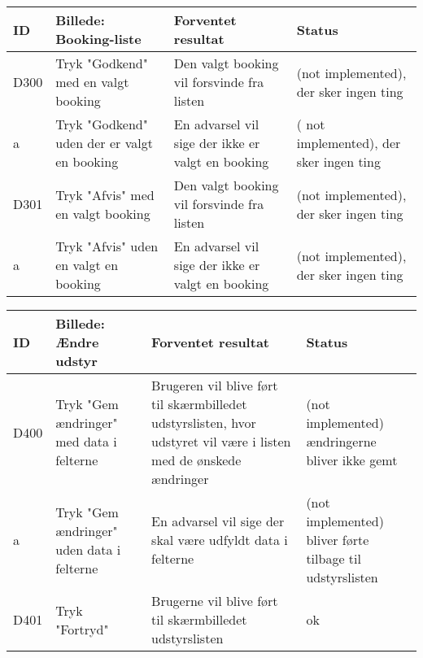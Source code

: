 \begin{tabularx}{\textwidth}{ |X|X|X|X| }
\hline
	ID & Billede: Booking-liste  & Forventet resultat & Status\\ 
\hline
	D300 & Tryk "Godkend" med en valgt booking & Den valgt booking vil forsvinde fra listen & (not implemented), der sker ingen ting \\
\hline
	a & Tryk "Godkend" uden der er valgt en booking & En advarsel vil sige der ikke er valgt en booking &( not implemented), der sker ingen ting \\
\hline
	D301 & Tryk "Afvis" med en valgt booking & Den valgt booking vil forsvinde fra listen & (not implemented), der sker ingen ting \\
\hline
	a & Tryk "Afvis" uden en valgt en booking & En advarsel vil sige der ikke er valgt en booking & (not implemented), der sker ingen ting \\
\hline
\end{tabularx}

\begin{tabularx}{\textwidth}{ |X|X|X|X| }
\hline
	ID & Billede: Ændre udstyr & Forventet resultat & Status\\ 
\hline
	D400 & Tryk "Gem ændringer" med data i felterne & Brugeren vil blive ført til skærmbilledet udstyrslisten, hvor udstyret vil være i listen med de ønskede ændringer &(not implemented) ændringerne bliver ikke gemt \\
\hline
	a & Tryk "Gem ændringer" uden data i felterne & En advarsel vil sige der skal være udfyldt data i felterne &(not implemented) bliver førte tilbage til udstyrslisten \\
\hline
	D401 & Tryk "Fortryd" & Brugerne vil blive ført til skærmbilledet udstyrslisten & ok \\
\hline
\end{tabularx}

